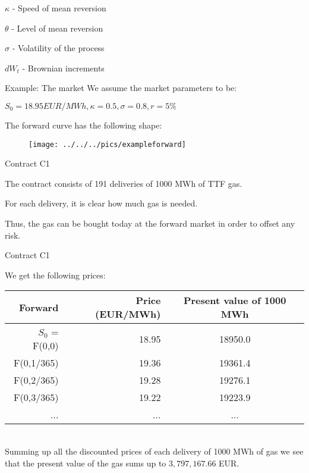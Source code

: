 



	$\kappa$ - Speed of mean reversion


	$\theta$ - Level of mean reversion


	$\sigma$ - Volatility of the process


	$dW_t$ - Brownian increments





{Example: The market}
We assume the market parameters to be:






	$S_0 = 18.95 EUR/MWh, \kappa = 0.5, \sigma = 0.8, r= 5\%$




The forward curve has the following shape:
\begin{figure}
	\centering
		\texttt{[image: ../../../pics/exampleforward]}
	\label{fig:exampleforward}
\end{figure}

{Contract C1}






	The contract consists of 191 deliveries of 1000 MWh of TTF gas.


	For each delivery, it is clear how much gas is needed.


	Thus, the gas can be bought today at the forward market in order to offset any risk.





{Contract C1}

We get the following prices:
\begin{tabular}{rrc}
   Forward &      Price (EUR/MWh)& Present value of 1000 MWh \\
\hline
$S_0$ = F(0,0) &         18.95 &      18950.0 \\

 F(0,1/365) &    19.36 &    19361.4 \\

 F(0,2/365) &    19.28 &    19276.1 \\

 F(0,3/365) &    19.22 &    19223.9 \\
...&...&...\\
\end{tabular}  \\
Summing up all the discounted prices of each delivery of 1000 MWh of gas we see that the present value of the gas sums up to $3,797,167.66$ EUR.

